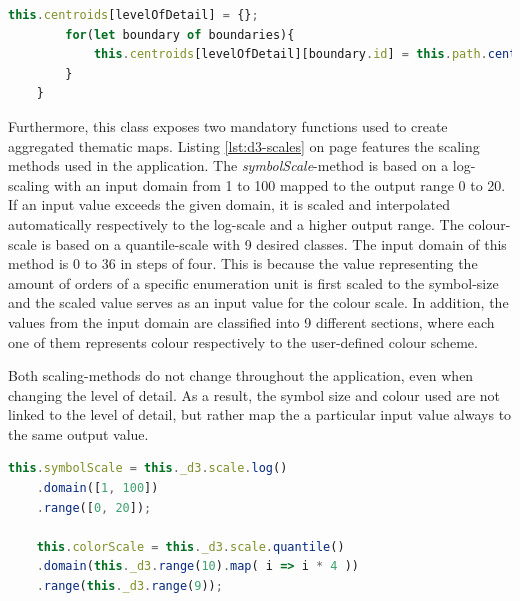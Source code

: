 \begin{description}
\begin{lstlisting}[language=JavaScript, caption={Calculate a look-up dictionary for all data items depending on the level of detail.}, label={lst:d3-calculate-centroids}]
        this.centroids[levelOfDetail] = {};
        for(let boundary of boundaries){
            this.centroids[levelOfDetail][boundary.id] = this.path.centroid(boundary);
        }
    }
\end{lstlisting}

Furthermore, this class exposes two mandatory functions used to create aggregated thematic maps. Listing \ref{lst:d3-scales} on page \pageref{lst:d3-scales} features the scaling methods used in the application. The \textit{symbolScale}-method is based on a log-scaling with an input domain from 1 to 100 mapped to the output range 0 to 20. If an input value exceeds the given domain, it is scaled and interpolated automatically respectively to the log-scale and a higher output range. The colour-scale is based on a quantile-scale with 9 desired classes. The input domain of this method is 0 to 36 in steps of four. This is because the value representing the amount of orders of a specific enumeration unit is first scaled to the symbol-size and the scaled value serves as an input value for the colour scale. In addition, the values from the input domain are classified into 9 different sections, where each one of them represents colour respectively to the user-defined colour scheme.

Both scaling-methods do not change throughout the application, even when changing the level of detail. As a result, the symbol size and colour used are not linked to the level of detail, but rather map the a particular input value always to the same output value.

\begin{lstlisting}[language=JavaScript, caption={Symbol-scale and colour-scale used for aggregated thematic maps.}, label={lst:d3-scales}]
    this.symbolScale = this._d3.scale.log()
    .domain([1, 100])
    .range([0, 20]);

    this.colorScale = this._d3.scale.quantile()
    .domain(this._d3.range(10).map( i => i * 4 ))
    .range(this._d3.range(9));
\end{lstlisting}


\end{description}
